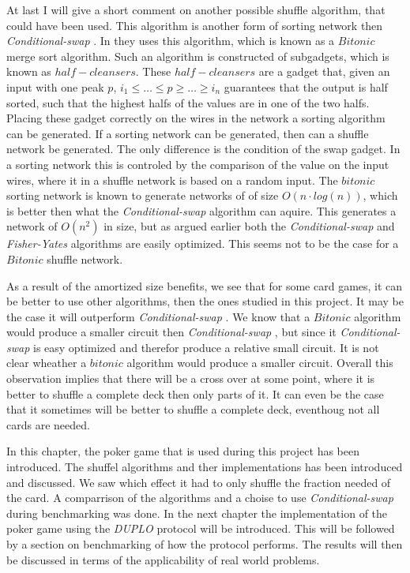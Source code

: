\documentclass[twoside,11pt,openright]{report}
\newcommand{\FY}{\textit{Fisher-Yates} }
\newcommand{\CS}{\textit{Conditional-swap} }
\newcommand{\DUPLO}{\textit{DUPLO} }
\begin{document}
At last I will give a short comment on another possible shuffle algorithm, that could have been used. This algorithm is another form of sorting network then \CS. In \cite{psi} they uses this algorithm, which is known as a $Bitonic$ merge sort algorithm. Such an algorithm is constructed of subgadgets, which is known as $half-cleansers$. These $half-cleansers$ are a gadget that, given an input with one peak $p$, $i_1\leq \dots \leq p \geq \dots \geq i_n$ guarantees that the output is half sorted, such that the highest halfs of the values are in one of the two halfs. Placing these gadget correctly on the wires in the network a sorting algorithm can be generated. If a sorting network can be generated, then can a shuffle network be generated. The only difference is the condition of the swap gadget. In a sorting network this is controled by the comparison of the value on the input wires, where it in a shuffle network is based on a random input. The $bitonic$ sorting network is known to generate networks of of size $O(n\cdot log(n))$, which is better then what the \CS algorithm can aquire. This generates a network of $O(n^2)$ in size, but as argued earlier both the \CS and \FY algorithms are easily optimized. This seems not to be the case for a $Bitonic$ shuffle network.

As a result of the amortized size benefits, we see that for some card games, it can be better to use other algorithms, then the ones studied in this project. It may be the case it will outperform \CS. We know that a $Bitonic$ algorithm would produce a smaller circuit then \CS, but since it \CS is easy optimized and therefor produce a relative small circuit. It is not clear wheather a $bitonic$ algorithm would produce a smaller circuit. Overall this observation implies that there will be a cross over at some point, where it is better to shuffle a complete deck then only parts of it. It can even be the case that it sometimes will be better to shuffle a complete deck, eventhoug not all cards are needed.

\bigskip

In this chapter, the poker game that is used during this project has been introduced. The shuffel algorithms and ther implementations has been introduced and discussed. We saw which effect it had to only shuffle the fraction needed of the card. A comparrison of the algorithms and a choise to use \CS during benchmarking was done. In the next chapter the implementation of the poker game using the \DUPLO protocol will be introduced. This will be followed by a section on benchmarking of how the protocol performs. The results will then be discussed in terms of the applicability of real world problems.
\end{document}
